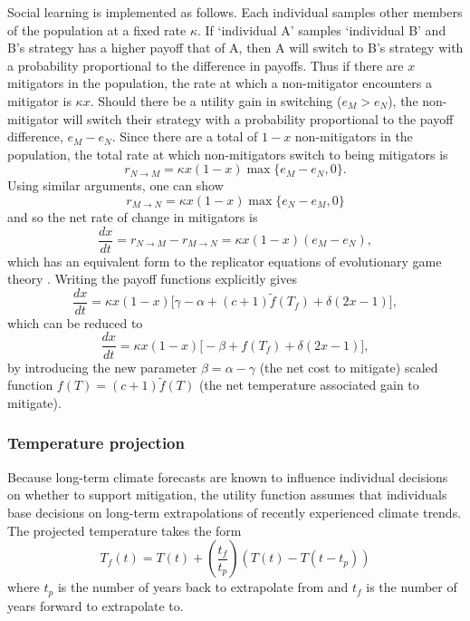 \documentclass[10pt,letterpaper]{article}
\begin{document}
Social learning is implemented as follows. Each individual samples other members of the population at a fixed rate $\kappa$. If `individual A' samples `individual B' and B's strategy has a higher payoff that of A, then A will switch to B's strategy with a probability proportional to the difference in payoffs. Thus if there are $x$ mitigators in the population, the rate at which a non-mitigator encounters a mitigator is $\kappa x$. Should there be a utility gain in switching ($e_M>e_N$), the non-mitigator will switch their strategy with a probability proportional to the payoff difference, $e_M-e_N$. Since there are a total of $1-x$ non-mitigators in the population, the total rate at which non-mitigators switch to being mitigators is
\begin{equation}
r_{N\to M} = \kappa x(1-x) \max \{e_M-e_N,0 \}.
\end{equation}
Using similar arguments, one can show
\begin{equation}
r_{M\to N} = \kappa x(1-x) \max \{e_N-e_M,0 \}
\end{equation}
and so the net rate of change in mitigators is
\begin{equation}
\frac{dx}{dt} = r_{N\to M} - r_{M \to N} = \kappa x(1-x)(e_M-e_N),
\end{equation}
which has an equivalent form to the replicator equations of evolutionary game theory \cite{hofbauer98}. Writing the payoff functions explicitly gives
\begin{equation}
\frac{dx}{dt} = \kappa x (1-x) \big[ \gamma-\alpha + (c+1)\tilde{f}(T_f) + \delta(2x-1)\big],
\end{equation}
which can be reduced to
\begin{equation}
\label{eq:model_x}
\frac{dx}{dt} = \kappa x (1-x) \big[ -\beta + f(T_f) + \delta(2x-1)\big],
\end{equation}
by introducing the new parameter $\beta = \alpha-\gamma$ (the net cost to mitigate) scaled function $f(T) = (c+1)\tilde{f}(T)$ (the net temperature associated gain to mitigate).


\subsubsection*{Temperature projection} Because long-term climate forecasts are known to influence individual decisions on whether to support mitigation\cite{weber10}, the utility function assumes that individuals base decisions on long-term extrapolations of recently experienced climate trends. The projected temperature takes the form
\begin{equation}
T_f(t) = T(t) + \left(\frac{t_f}{t_p}\right) (T(t)-T(t-t_p)) 
\end{equation}
where $t_p$ is the number of years back to extrapolate from and $t_f$ is the number of years forward to extrapolate to.
\end{document}
